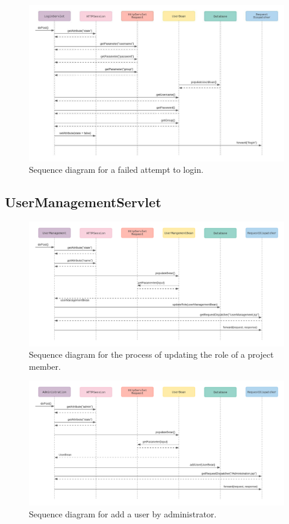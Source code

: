 \documentclass{article}
\begin{document}
\begin{figure}[H]
    \centering
    \includegraphics[scale=0.4]{images/failedLogin.jpeg}
    \caption{Sequence diagram for a failed attempt to login.}
    \label{fig:failedLoginAttempt}
\end{figure}

\pagebreak
\subsection{UserManagementServlet}

\begin{figure}[H]
    \centering
    \includegraphics[scale=0.5]{images/updateRole.png}
    \caption{Sequence diagram for the process of updating the role of a project member.}
    \label{fig:successfulLogin}
\end{figure}

\begin{figure}[H]
    \centering
    \includegraphics[scale=0.4]{images/AddUser.png}
    \caption{Sequence diagram for add a user by administrator.}
    \label{fig:failedLoginAttempt}
\end{figure}
\end{document}
